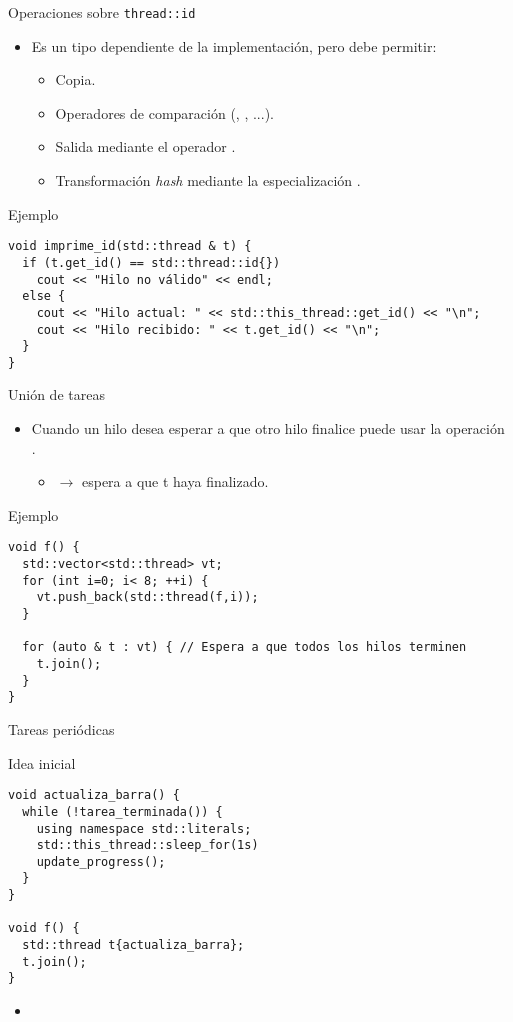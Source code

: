 \begin{frame}[fragile]{Operaciones sobre \texttt{thread::id}}
\begin{itemize}
  \item Es un tipo dependiente de la implementación, pero debe permitir:
    \begin{itemize}
      \item Copia.
      \item Operadores de comparación (\cppid{==}, \cppid{<}, ...).
      \item Salida mediante el operador \cppid{<<}.
      \item Transformación \emph{hash} mediante la especialización .
    \end{itemize}
\end{itemize}
\begin{block}{Ejemplo}
\begin{lstlisting}
void imprime_id(std::thread & t) {
  if (t.get_id() == std::thread::id{}) 
    cout << "Hilo no válido" << endl;
  else {
    cout << "Hilo actual: " << std::this_thread::get_id() << "\n";
    cout << "Hilo recibido: " << t.get_id() << "\n";
  }
}
\end{lstlisting}
\end{block}
\end{frame}

\begin{frame}[fragile]{Unión de tareas}
\begin{itemize}
  \item Cuando un hilo desea esperar a que otro hilo finalice puede usar la operación .
    \begin{itemize}
      \item {} $\rightarrow$ espera a que t haya finalizado.
    \end{itemize}
\end{itemize}
\begin{block}{Ejemplo}
\begin{lstlisting}
void f() {
  std::vector<std::thread> vt;
  for (int i=0; i< 8; ++i) {
    vt.push_back(std::thread(f,i));
  }

  for (auto & t : vt) { // Espera a que todos los hilos terminen
    t.join();
  }
}
\end{lstlisting}
\end{block}
\end{frame}

\begin{frame}[fragile]{Tareas periódicas}
\begin{block}{Idea inicial}
\begin{lstlisting}
void actualiza_barra() {
  while (!tarea_terminada()) {
    using namespace std::literals;
    std::this_thread::sleep_for(1s)
    update_progress();
  }
}

void f() {
  std::thread t{actualiza_barra};
  t.join();
}
\end{lstlisting}
\end{block}
\begin{itemize}
  \item {}
\end{itemize}
\end{frame}

